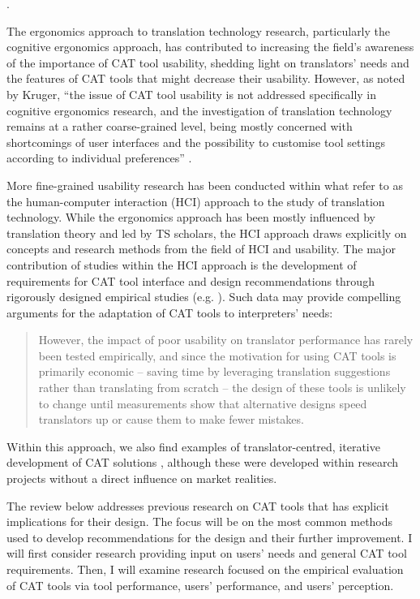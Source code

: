 \citep[81]{teixeira2017investigating}.

The ergonomics approach to translation technology research, particularly the cognitive ergonomics approach, has contributed to increasing the field’s awareness of the importance of CAT tool usability, shedding light on translators’ needs and the features of CAT tools that might decrease their usability. However, as noted by Kruger, ``the issue of CAT tool usability is not addressed specifically in cognitive ergonomics research, and the investigation of translation technology remains at a rather coarse-grained level, being mostly concerned with shortcomings of user interfaces and the possibility to customise tool settings according to individual preferences'' \citep[128]{kruger2016contextualising}.

More fine-grained usability research has been conducted within what \citet{laubli2019translation} refer to as the human-computer interaction (HCI) approach to the study of translation technology. While the ergonomics approach has been mostly influenced by translation theory and led by TS scholars, the HCI approach draws explicitly on concepts and research methods from the field of HCI and usability. The major contribution of studies within the HCI approach is the development of requirements for CAT tool interface and design recommendations through rigorously designed empirical studies (e.g. \citealt{laubli2020machine, laubli2021impact}). Such data may provide compelling arguments for the adaptation of CAT tools to interpreters’ needs:
\begin{quote}
    However, the impact of poor usability on translator performance has rarely been tested empirically, and since the motivation for using CAT tools is primarily economic – saving time by leveraging translation suggestions rather than translating from scratch – the design of these tools is unlikely to change until measurements show that alternative designs speed translators up or cause them to make fewer mistakes. \citep[1]{laubli2020machine}
\end{quote}
Within this approach, we also find examples of translator-centred, iterative development of CAT solutions \citep{coppers2018intellingo,green2014predictive,teixeira2019creating}, although these were developed within research projects without a direct influence on market realities.

The review below addresses previous research on CAT tools that has explicit implications for their design. The focus will be on the most common methods used to develop recommendations for the design and their further improvement. I will first consider research providing input on users’ needs and general CAT tool requirements. Then, I will examine research focused on the empirical evaluation of CAT tools via tool performance, users’ performance, and users’ perception.

